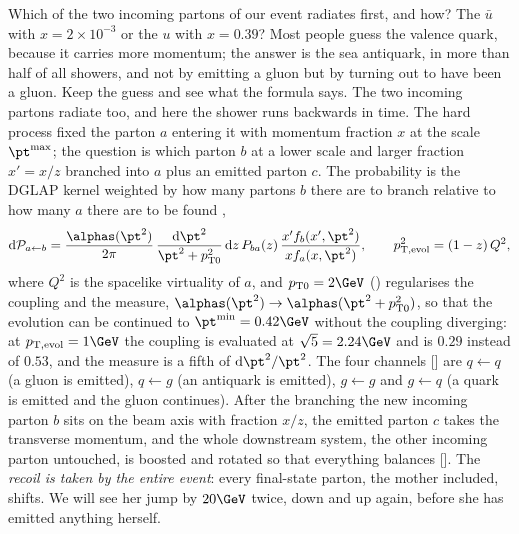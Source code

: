 Which of the two incoming partons of our event radiates first, and how? The
$\bar u$ with $x=2\times10^{-3}$ or the $u$ with $x=0.39$? Most people
guess the valence quark, because it carries more momentum; the answer is
the sea antiquark, in more than half of all showers, and not by emitting a
gluon but by turning out to have been a gluon. Keep the guess and see what
the formula says. The two incoming partons radiate too, and here the shower
runs backwards in time. The hard process fixed the parton $a$ entering it with momentum
fraction $x$ at the scale $\pt^{\max}$; the question is which parton $b$ at
a lower scale and larger fraction $x'=x/z$ branched into $a$ plus an emitted
parton $c$. The probability is the DGLAP kernel weighted by how many partons
$b$ there are to branch relative to how many $a$ there are to be found
\cite{Sjostrand:2004ef},
\begin{equation}
  \mathrm{d}\mathcal P_{a\leftarrow b}
  =\frac{\alphas(\pt^2)}{2\pi}\,
  \frac{\mathrm{d}\pt^2}{\pt^2+p_{\mathrm{T}0}^2}\,
  \mathrm{d}z\,P_{ba}(z)\,
  \frac{x'f_b(x',\pt^2)}{x f_a(x,\pt^2)},
  \qquad
  \ptevol^2=(1-z)\,Q^2 ,
  \label{eq:mother_gives_birth:isr}
\end{equation}
where $Q^2$ is the spacelike virtuality of $a$, and $p_{\mathrm{T}0}=2\GeV$
() regularises the coupling and the measure,
$\alphas(\pt^2)\to\alphas(\pt^2+p_{\mathrm{T}0}^2)$, so that the evolution can be
continued to $\pt^{\min}=0.42\GeV$ without the coupling diverging: at
$\ptevol=1\GeV$ the coupling is evaluated at $\sqrt5=2.24\GeV$ and is
$0.29$ instead of $0.53$, and the measure is a fifth of $\mathrm{d}\pt^2/\pt^2$. The
four channels [] are $q\leftarrow q$ (a gluon is
emitted), $q\leftarrow g$ (an antiquark is emitted), $g\leftarrow g$ and
$g\leftarrow q$ (a quark is emitted and the gluon continues). After the
branching the new incoming parton $b$ sits on the beam axis with fraction
$x/z$, the emitted parton $c$ takes the transverse momentum, and the whole
downstream system, the other incoming parton untouched, is boosted and
rotated so that everything balances []. The
\emph{recoil is taken by the entire event}: every final-state parton, the
mother included, shifts. We will see her \pt jump by $20\GeV$ twice, down
and up again, before she has emitted anything herself.

